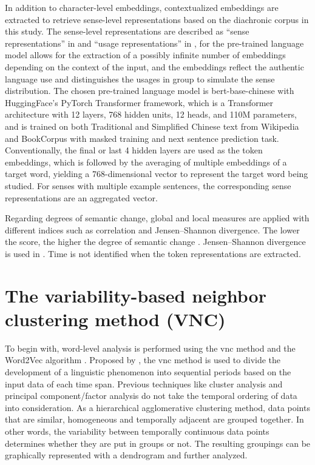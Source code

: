 In addition to character-level embeddings, contextualized embeddings are extracted to retrieve sense-level representations based on the diachronic corpus in this study. The sense-level representations are described as ``sense representations'' in \textcite{hu2019diachronic} and ``usage representations'' in \textcite{giulianelli2019lexical}, for the pre-trained language model allows for the extraction of a possibly infinite number of embeddings depending on the context of the input, and the embeddings reflect the authentic language use and distinguishes the usages in group to simulate the sense distribution. The chosen pre-trained language model is bert-base-chinese \parencite{devlin2018bert} with HuggingFace's PyTorch Transformer framework, which is a Transformer architecture with 12 layers, 768 hidden units, 12 heads, and 110M parameters, and is trained on both Traditional and Simplified Chinese text from Wikipedia and BookCorpus with masked training and next sentence prediction task. Conventionally, the final or last 4 hidden layers are used as the token embeddings, which is followed by the averaging of multiple embeddings of a target word, yielding a 768-dimensional vector to represent the target word being studied. For senses with multiple example sentences, the corresponding sense representations are an aggregated vector.

Regarding degrees of semantic change, global and local measures are applied with different indices such as correlation and Jensen–Shannon divergence. The lower the score, the higher the degree of semantic change \parencite{hamilton2016law}. Jensen–Shannon divergence is used in \textcite{giulianelli2019lexical}. Time is not identified when the token representations are extracted.

\section{The variability-based neighbor clustering method ({VNC})}
To begin with, word-level analysis is performed using the \gls{vnc} method \parencite{gries2012variability} and the Word2Vec algorithm \parencite{mikolov2013efficient}. Proposed by \textcite{gries2012variability}, the \gls{vnc} method is used to divide the development of a linguistic phenomenon into sequential periods based on the input data of each time span. Previous techniques like cluster analysis and principal component/factor analysis do not take the temporal ordering of data into consideration. As a hierarchical agglomerative clustering method, data points that are similar, homogeneous and temporally adjacent are grouped together. In other words, the variability between temporally continuous data points determines whether they are put in groups or not. The resulting groupings can be graphically represented with a dendrogram and further analyzed.

